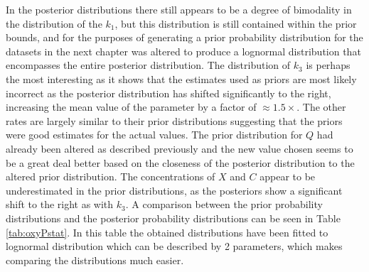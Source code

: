 In the posterior distributions there still appears to be a degree of bimodality in the distribution of the $k_1$, but this distribution is still contained within the prior bounds, and for the purposes of generating a prior probability distribution for the datasets in the next chapter was altered to produce a lognormal distribution that encompasses the entire posterior distribution. The distribution of $k_3$ is perhaps the most interesting as it shows that the estimates used as priors are most likely incorrect as the posterior distribution has shifted significantly to the right, increasing the mean value of the parameter by a factor of $\approx 1.5 \times$. The other rates are largely similar to their prior distributions suggesting that the priors were good estimates for the actual values. The prior distribution for $Q$ had already been altered as described previously and the new value chosen seems to be a great deal better based on the closeness of the posterior distribution to the altered prior distribution. The concentrations of $X$ and $C$ appear to be underestimated in the prior distributions, as the posteriors show a significant shift to the right as with $k_3$. A comparison between the prior probability distributions and the posterior probability distributions can be seen in Table \ref{tab:oxyPstat}. In this table the obtained distributions have been fitted to lognormal distribution which can be described by 2 parameters, which makes comparing the distributions much easier.
